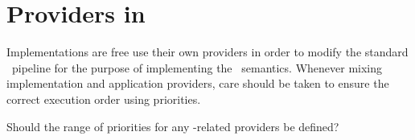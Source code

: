\section{Providers in \mvc}
\label{providers_in_mvc}

Implementations are free use their own providers in order to modify the standard 
\jaxrs\ pipeline for the purpose of implementing the \mvc\ semantics. Whenever mixing 
implementation and application providers, care should be taken to ensure the correct 
execution order using priorities.

\begin{ednote}
Should the range of priorities for any \mvc -related providers be defined?
\end{ednote}


